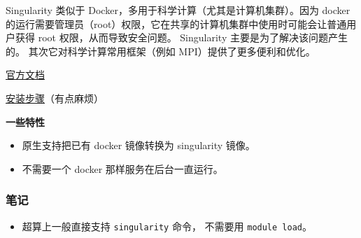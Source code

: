 
\begin{issues}
\issueDraft
\end{issues}

Singularity 类似于 Docker，多用于科学计算（尤其是计算机集群）。因为 docker 的运行需要管理员（root）权限，它在共享的计算机集群中使用时可能会让普通用户获得 root 权限，从而导致安全问题。 Singularity 主要是为了解决该问题产生的。 其次它对科学计算常用框架（例如 MPI）提供了更多便利和优化。

\href{https://docs.sylabs.io/guides/3.0/user-guide/index.html}{官方文档}

\href{https://docs.sylabs.io/guides/3.0/user-guide/quick_start.html#quick-installation-steps}{安装步骤}（有点麻烦）

\textbf{一些特性}
\begin{itemize}
\item 原生支持把已有 docker 镜像转换为 singularity 镜像。
\item 不需要一个 docker 那样服务在后台一直运行。
\end{itemize}


\subsubsection{笔记}
\begin{itemize}
\item 超算上一般直接支持 \verb|singularity| 命令， 不需要用 \verb|module load|。
\end{itemize}
